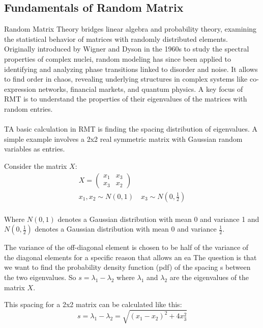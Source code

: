 \subsection{Fundamentals of Random Matrix}\label{subsec:fundamentals-of-random-matrix}

Random Matrix Theory bridges linear algebra and probability theory\supercite{vivo_random_2017}, examining the statistical behavior of matrices with randomly distributed elements.
Originally introduced by Wigner and Dyson in the 1960s to study the spectral properties of complex nuclei, random modeling has since been applied to identifying and analyzing phase transitions linked to disorder and noise\supercite{deng_molecular_2012}.
It allows to find order in chaos, revealing underlying structures in complex systems like co-expression networks\supercite{luo_constructing_2007}, financial markets\supercite{pharasi_complex_2018}, and quantum physics\supercite{guhr_random_1997}.
A key focus of RMT is to understand the properties of their eigenvalues of the matrices with random entries.
\\\\
\noindent TA basic calculation in RMT is finding the spacing distribution of eigenvalues.
A simple example involves a 2x2 real symmetric matrix with Gaussian random variables as entries.

\noindent Consider the matrix $X$:
\begin{gather*}
    X=\begin{pmatrix}
x_1 & x_3\\ x_3 & x_2
\end{pmatrix}\\
    x_1, x_2 \sim N(0,1) \quad x_3 \sim N(0,\frac{1}{2})\\
\end{gather*}


\noindent Where $N(0,1)$ denotes a Gaussian distribution with mean 0 and variance 1 and $N(0,\frac{1}{2})$ denotes a Gaussian distribution with mean 0 and variance $\frac{1}{2}$.

The variance of the off-diagonal element is chosen to be half of the variance of the diagonal elements for a specific reason that allows an ea
The question is that we want to find the probability density function (pdf) of the spacing s between the two eigenvalues.
So $s=\lambda_1-\lambda_2$ where $\lambda_1$ and $\lambda_2$ are the eigenvalues of the matrix $X$.

\noindent This spacing for a 2x2 matrix can be calculated like this:
\[s = \lambda_1 - \lambda_2 = \sqrt{(x_1 - x_2)^2 + 4x_3^2}\]


